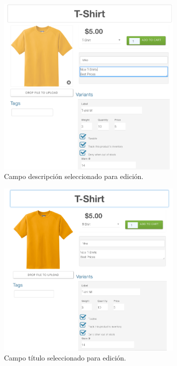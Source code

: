 		\begin{figure}[H]
			\centering
			\includegraphics[width=0.8\textwidth]{figuras/productos/details/write/main_menu_description_selected.png}

			\caption{Campo descripción seleccionado para edición.}
			\label{figure:productos:details:write:main_menu_description_selected}
		\end{figure}


		\begin{figure}[H]
			\centering
			\includegraphics[width=0.8\textwidth]{figuras/productos/details/write/main_menu_title_selected.png}

			\caption{Campo título seleccionado para edición.}
			\label{figure:productos:details:write:main_menu_title_selected}
		\end{figure}

